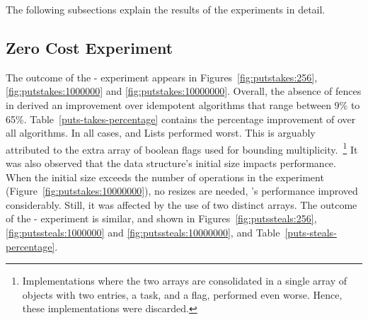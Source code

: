 The following subsections explain the results of the experiments in detail.

\subsection{Zero Cost Experiment}


The outcome of the \Puts{}-\Takes{} experiment appears in Figures~\ref{fig:putstakes:256}, \ref{fig:putstakes:1000000} and \ref{fig:putstakes:10000000}.  Overall, the absence of fences in \NCWSM derived an improvement over idempotent algorithms that range between 9\% to 65\%. Table~\ref{puts-takes-percentage} contains the percentage improvement of \NCWSM over all algorithms. In all cases, \BNCWSM and \BNCWSM Lists performed worst. This is arguably attributed to the extra array of boolean flags used for bounding multiplicity.~\footnote{Implementations where the two arrays are consolidated in a single array of objects with two entries, a task, and a flag, performed even worse. Hence, these implementations were discarded.}  It was also observed that the data structure's initial size impacts performance. When the initial size exceeds the number of operations in the experiment (Figure~\ref{fig:putstakes:10000000}), no resizes are needed, \BNCWSM's performance improved considerably. Still, it was affected by the use of two distinct arrays. The outcome of the \Puts{}-\Steal{}{} experiment is similar, and shown in Figures~\ref{fig:putssteals:256}, \ref{fig:putssteals:1000000} and \ref{fig:putssteals:10000000}, and Table~\ref{puts-steals-percentage}. %





